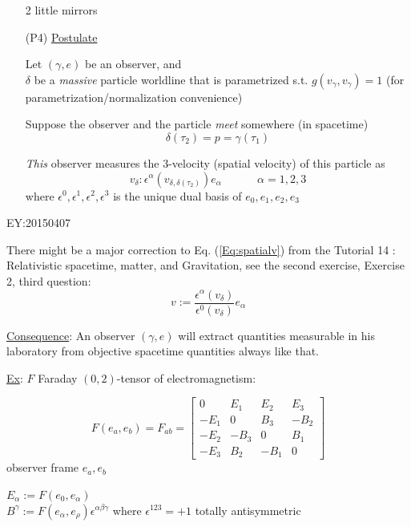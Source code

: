 \documentclass[10pt]{amsart}
\begin{document}
\begin{multicols*}{2}
\begin{enumerate}
		2 little mirrors
		\item[(P4)] \underline{Postulate}
		
		Let $(\gamma, e)$ be an observer, and \\
		$\delta$ be a \emph{massive} particle worldline that is parametrized s.t. $g(v_{\gamma}, v_{\gamma})=1$ (for parametrization/normalization convenience)
		
		Suppose the observer and the particle \emph{meet} somewhere (in spacetime)
		\[
		\delta(\tau_2) = p = \gamma(\tau_1)
		\]
		
		\emph{This} observer measures the 3-velocity (spatial velocity) of this particle as 
		\begin{equation}\label{Eq:spatialv}
		v_{\delta}: \epsilon^{\alpha}( v_{\delta, \delta(\tau_2)} ) e_{\alpha} \quad \quad \quad \, \alpha =1,2,3
		\end{equation}
		where $\epsilon^0, \boxed{ \epsilon^1,\epsilon^2,\epsilon^3}$ is the unique dual basis of $e_0,\boxed{ e_1,e_2,e_3}$
	\end{enumerate}
	
	EY:20150407
	
	There might be a major correction to Eq. (\ref{Eq:spatialv}) from the Tutorial 14 : Relativistic spacetime, matter, and Gravitation, see the second exercise, Exercise 2, third question:
	\begin{equation}
	v := \frac{ \epsilon^{\alpha}({v}_{\delta} ) }{ \epsilon^0({v}_{\delta}) } e_{\alpha}
	\end{equation}
	
	\underline{Consequence}:
	An observer $(\gamma, e)$ will extract quantities measurable in his laboratory from objective spacetime quantities always like that.
	
	\underline{Ex}: $F$ Faraday $(0,2)$-tensor of electromagnetism:
	
	\[
	F(e_a,e_b) = F_{ab} = \left[ \begin{matrix} 0 & E_1 & E_2 & E_3 \\ 
	-E_1 & 0 & B_3 & -B_2 \\ 
	-E_2 & -B_3 & 0 & B_1 \\
	-E_3 & B_2 & -B_1 & 0 \end{matrix} \right]
	\]
	observer frame $e_a,e_b$
	
	$E_{\alpha} := F(e_0,e_{\alpha})$ \\
	$B^{\gamma}:= F(e_{\alpha},e_{\rho})\epsilon^{\alpha \beta \gamma}$
	where 
	$\epsilon^{123} = +1$ totally antisymmetric
	

\end{multicols*}
\end{document}
